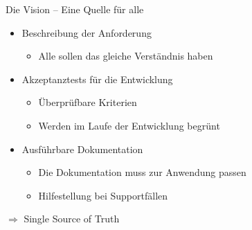 \begin{frame}{Die Vision -- Eine Quelle für alle}

\begin{itemize}
	\item Beschreibung der Anforderung
	\begin{itemize}
		\item Alle sollen das gleiche Verständnis haben
	\end{itemize}

	
	\item Akzeptanztests für die Entwicklung
	\begin{itemize}
		\item Überprüfbare Kriterien
		\item Werden im Laufe der Entwicklung \glqq begrünt\grqq
	\end{itemize}

	
	\item Ausführbare Dokumentation
	\begin{itemize}
		\item Die Dokumentation muss zur Anwendung passen
		\item Hilfestellung bei Supportfällen
	\end{itemize}
\end{itemize}

\vspace{1em}

$\Rightarrow$ Single Source of Truth

\end{frame}


%
%
%



